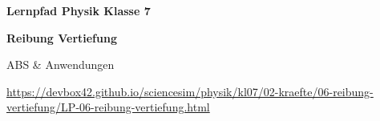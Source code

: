 \documentclass[a4paper]{article}
\begin{document}
\pagestyle{empty}

\begin{center}
\vspace*{3cm}

{\LARGE\bfseries\textcolor{physik}{Lernpfad Physik Klasse 7}}

\vspace{1cm}

{\Huge\bfseries Reibung Vertiefung}

\vspace{0.5cm}

{\large ABS \& Anwendungen}

\vspace{2cm}

\href{https://devbox42.github.io/sciencesim/physik/kl07/02-kraefte/06-reibung-vertiefung/LP-06-reibung-vertiefung.html}{%
%
}

\vspace{1.5cm}

{\small\url{https://devbox42.github.io/sciencesim/physik/kl07/02-kraefte/06-reibung-vertiefung/LP-06-reibung-vertiefung.html}}

\end{center}
\end{document}
